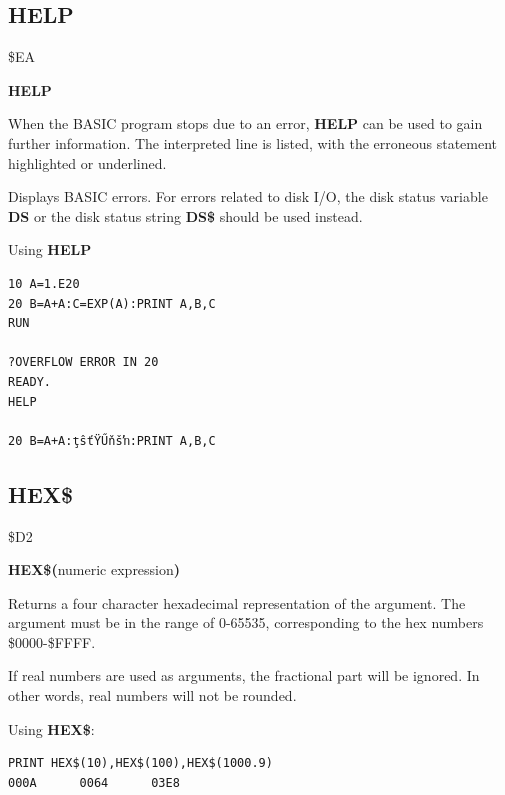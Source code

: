 \subsection{HELP}
\begin{description}[leftmargin=2cm,style=nextline]
\item [Token:] \$EA
\item [Format:] {\bf HELP}
\item [Usage:]
   When the BASIC program stops due to an error,
   {\bf HELP} can be used to gain further information.
   The interpreted line is listed, with the
   erroneous statement highlighted or underlined.

\item [Remarks:]
      Displays BASIC errors. For errors related to disk
      I/O, the disk status variable {\bf DS}
      or the disk status string {\bf DS\$} should be used instead.

\item [Example:] Using {\bf HELP}
\begin{tcolorbox}[colback=black,coltext=white]
\verbatimfont{\codefont}
\begin{verbatim}
10 A=1.E20
20 B=A+A:C=EXP(A):PRINT A,B,C
RUN

?OVERFLOW ERROR IN 20
READY.
HELP

20 B=A+A:ţŝťŸŰňšŉ:PRINT A,B,C
\end{verbatim}
\end{tcolorbox}
\end{description}


\newpage
\subsection{HEX\$}
\begin{description}[leftmargin=2cm,style=nextline]
\item [Token:] \$D2
\item [Format:] {\bf HEX\$(}numeric expression{\bf)}
\item [Usage:] Returns a four character hexadecimal
               representation of the argument.
               The argument must be in the range of 0-65535,
               corresponding to the hex numbers \$0000-\$FFFF.

\item [Remarks:] If real numbers are used as arguments, the
                 fractional part will be ignored. In other words, real numbers
                 will not be rounded.

\item [Example:] Using {\bf HEX\$}:
\begin{tcolorbox}[colback=black,coltext=white]
\verbatimfont{\codefont}
\begin{verbatim}
PRINT HEX$(10),HEX$(100),HEX$(1000.9)
000A      0064      03E8
\end{verbatim}
\end{tcolorbox}
\end{description}

